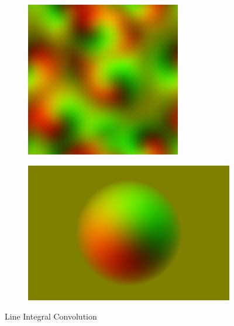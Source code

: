\begin{figure}
\begin{subfigure}{0.45\textwidth}
		\caption{}
		\label{fig:mylic2}
	\end{subfigure}
	\newline 
	\par\bigskip\par\bigskip
	\begin{subfigure}{0.45\textwidth}
		\includegraphics[height=\textwidth,width=\textwidth]{figures/mylic3.jpg}
		\caption{}
		\label{fig:mylic3}
	\end{subfigure}
	\hfill
	\begin{subfigure}{0.45\textwidth}
		\includegraphics[height=\textwidth,width=\textwidth]{figures/mylic4.png}
		\caption{}
		\label{fig:mylic4}
	\end{subfigure}
	\caption{Line Integral Convolution}
	\label{fig:mylic}
\end{figure}

